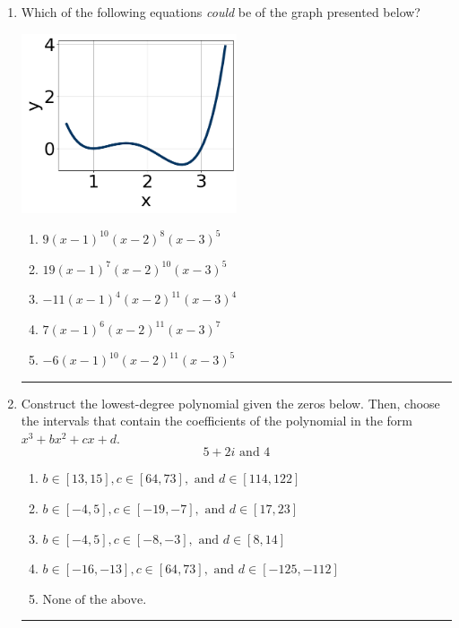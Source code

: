 \documentclass[14pt]{extbook}
\newcommand{\litem}[1]{\item#1\hspace*{-1cm}\rule{\textwidth}{0.4pt}}
\begin{document}
\begin{enumerate}
\litem{
Which of the following equations \textit{could} be of the graph presented below?
\begin{center}
    \includegraphics[width=0.5\textwidth]{../Figures/polyGraphToFunctionC.png}
\end{center}
\begin{enumerate}[label=\Alph*.]
\item \( 9(x - 1)^{10} (x - 2)^{8} (x - 3)^{5} \)
\item \( 19(x - 1)^{7} (x - 2)^{10} (x - 3)^{5} \)
\item \( -11(x - 1)^{4} (x - 2)^{11} (x - 3)^{4} \)
\item \( 7(x - 1)^{6} (x - 2)^{11} (x - 3)^{7} \)
\item \( -6(x - 1)^{10} (x - 2)^{11} (x - 3)^{5} \)

\end{enumerate} }
\litem{
Construct the lowest-degree polynomial given the zeros below. Then, choose the intervals that contain the coefficients of the polynomial in the form $x^3+bx^2+cx+d$.\[ 5 + 2 i \text{ and } 4 \]\begin{enumerate}[label=\Alph*.]
\item \( b \in [13, 15], c \in [64, 73], \text{ and } d \in [114, 122] \)
\item \( b \in [-4, 5], c \in [-19, -7], \text{ and } d \in [17, 23] \)
\item \( b \in [-4, 5], c \in [-8, -3], \text{ and } d \in [8, 14] \)
\item \( b \in [-16, -13], c \in [64, 73], \text{ and } d \in [-125, -112] \)
\item \( \text{None of the above.} \)


\end{enumerate}}
\end{enumerate}
\end{document}
